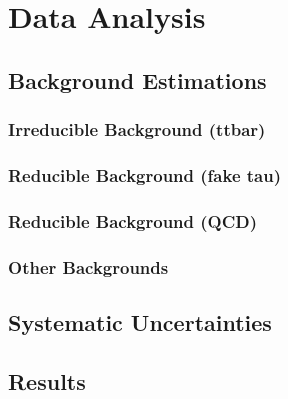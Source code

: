 \chapter{Data Analysis
\label{ch:analysis}}





\section{Background Estimations
\label{sec:background}}

\subsection{Irreducible Background (ttbar)}

\subsection{Reducible Background (fake tau)}

\subsection{Reducible Background (QCD)}

\subsection{Other Backgrounds}

\section{Systematic Uncertainties}

\section{Results}